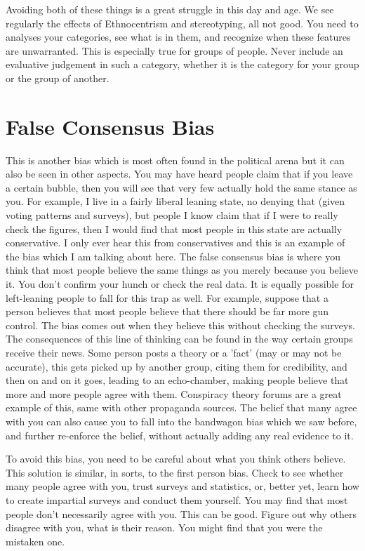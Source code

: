 Avoiding both of these things is a great struggle in this day and age. We see regularly the effects of Ethnocentrism and stereotyping, all not good. You need to analyses your categories, see what is in them, and recognize when these features are unwarranted. This is especially true for groups of people. Never include an evaluative judgement in such a category, whether it is the category for your group or the group of another.

\section{False Consensus Bias}

This is another bias which is most often found in the political arena but it can also be seen in other aspects. You may have heard people claim that if you leave a certain bubble, then you will see that very few actually hold the same stance as you. For example, I live in a fairly liberal leaning state, no denying that (given voting patterns and surveys), but people I know claim that if I were to really check the figures, then I would find that most people in this state are actually conservative. I only ever hear this from conservatives and this is an example of the bias which I am talking about here. The false consensus bias is where you think that most people believe the same things as you merely because you believe it. You don't confirm your hunch or check the real data. It is equally possible for left-leaning people to fall for this trap as well. For example, suppose that a person believes that most people believe that there should be far more gun control. The bias comes out when they believe this without checking the surveys. The consequences of this line of thinking can be found in the way certain groups receive their news. Some person posts a theory or a 'fact' (may or may not be accurate), this gets picked up by another group, citing them for credibility, and then on and on it goes, leading to an echo-chamber, making people believe that more and more people agree with them. Conspiracy theory forums are a great example of this, same with other propaganda sources. The belief that many agree with you can also cause you to fall into the bandwagon bias which we saw before, and further re-enforce the belief, without actually adding any real evidence to it.

To avoid this bias, you need to be careful about what you think others believe. This solution is similar, in sorts, to the first person bias. Check to see whether many people agree with you, trust surveys and statistics, or, better yet, learn how to create impartial surveys and conduct them yourself.   You may find that most people don't necessarily agree with you. This can be good. Figure out why others disagree with you, what is their reason. You might find that you were the mistaken one.
